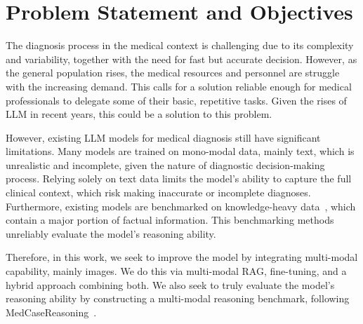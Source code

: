 \section{Problem Statement and Objectives}
\label{sec:problem-statement}

The diagnosis process in the medical context is challenging due to its complexity and variability,
together with the need for fast but accurate decision. However, as the general population rises, 
the medical resources and personnel are struggle with the increasing demand. 
This calls for a solution reliable enough for medical professionals to delegate some of their basic, repetitive tasks. 
Given the rises of \ac{LLM} in recent years, this could be a solution to this problem. 

However, existing \ac{LLM} models for medical diagnosis still have significant limitations.
Many models are trained on mono-modal data, mainly text, which is unrealistic and incomplete, given the nature of 
diagnostic decision-making process. 
Relying solely on text data limits the model's ability to capture the full clinical context, 
which risk making inaccurate or incomplete diagnoses.
Furthermore, existing models are benchmarked on knowledge-heavy data~\cite{thapa2025disentanglingreasoningknowledgemedical},
which contain a major portion of factual information. This benchmarking methods unreliably evaluate the model's reasoning ability. 

Therefore, in this work, we seek to improve the model by integrating multi-modal capability, mainly images. 
We do this via multi-modal \ac{RAG}, fine-tuning, and a hybrid approach combining both.
We also seek to truly evaluate the model's reasoning ability by constructing a multi-modal reasoning benchmark, 
following MedCaseReasoning~\cite{wu2025medcasereasoningevaluatinglearningdiagnostic}. 
